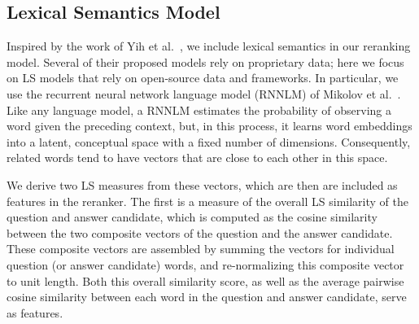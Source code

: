 \subsection{Lexical Semantics Model}
\label{sec:lexicalsemantics}

Inspired by the work of Yih et al.~\citeyear{yih13}, we include lexical semantics in our reranking model. 
Several of their proposed models rely on proprietary data; here we focus on LS models that rely on open-source data and frameworks. 
In particular, we use the recurrent neural network language model (RNNLM) of Mikolov et al.~\citeyear{mikolov13,mikolov10}.
Like any language model, a RNNLM estimates the probability of observing a word given the preceding context, but, in this process, it learns word embeddings into a latent, conceptual space with a fixed number of dimensions. 
Consequently, related words tend to have vectors that are close to each other in this space.

We derive two LS measures from these vectors, which are then are included as features in the reranker.  The first is a measure of the overall LS similarity of the question and answer candidate, which is computed as the cosine similarity between the two composite vectors of the question and the answer candidate.  These composite vectors are assembled by summing the vectors for individual question (or answer candidate) words, and re-normalizing this composite vector to unit length.  Both this overall similarity score, as well as the average pairwise cosine similarity between each word in the question and answer candidate, serve as features. 


%

